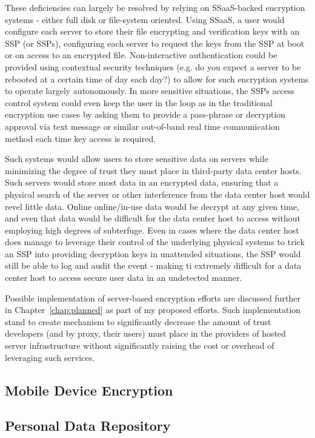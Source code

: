 These deficiencies can largely be resolved by relying on SSaaS-backed
encryption systems - either full disk or file-system oriented. Using
SSaaS, a user would configure each server to store their file
encrypting and verification keys with an SSP (or SSPs), configuring
each server to request the keys from the SSP at boot or on access to
an encrypted file. Non-interactive authentication could be provided
using contextual security techniques (e.g. do you expect a server to
be rebooted at a certain time of day each day?) to allow for such
encryption systems to operate largely autonomously. In more sensitive
situations, the SSPs access control system could even keep the user in
the loop as in the traditional encryption use cases by asking them to
provide a pass-phrase or decryption approval via text message or
similar out-of-band real time communication method each time key
access is required.

Such systems would allow users to store sensitive data on servers
while minimizing the degree of trust they must place in third-party
data center hosts. Such servers would store most data in an encrypted
data, ensuring that a physical search of the server or other
interference from the data center host would revel little data. Online
online/in-use data would be decrypt at any given time, and even that
data would be difficult for the data center host to access without
employing high degrees of subterfuge. Even in cases where the data
center host does manage to leverage their control of the underlying
physical systems to trick an SSP into providing decryption keys in
unattended situations, the SSP would still be able to log and audit
the event - making ti extremely difficult for a data center host to
access secure user data in an undetected manner.

Possible implementation of server-based encryption efforts are
discussed further in Chapter~\ref{chap:planned} as part of my
proposed efforts. Such implementation stand to create mechanism to
significantly decrease the amount of trust developers (and by proxy,
their users) must place in the providers of hosted server
infrastructure without significantly raising the cost or overhead of
leveraging such services.

\subsection{Mobile Device Encryption}


\subsection{Personal Data Repository}



